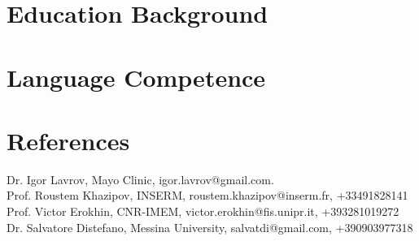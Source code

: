 \documentclass{moderncv}
\begin{document}

\section{Education Background}


\section{Language Competence}


\section{References}

Dr. Igor Lavrov, Mayo Clinic, igor.lavrov@gmail.com.\\
Prof. Roustem Khazipov, INSERM, roustem.khazipov@inserm.fr, +33491828141\\
Prof. Victor Erokhin, CNR-IMEM, victor.erokhin@fis.unipr.it, +393281019272\\
Dr. Salvatore Distefano, Messina University, salvatdi@gmail.com, +390903977318
\end{document}
